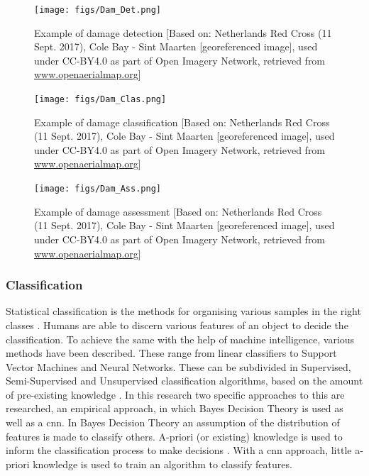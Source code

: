 \begin{figure}[!h]
	\centering
	\texttt{[image: figs/Dam\_Det.png]}
	\caption{\footnotesize{Example of damage detection [Based on: Netherlands Red Cross (11 Sept. 2017), Cole Bay - Sint Maarten [georeferenced image], used under CC-BY4.0 as part of Open Imagery Network, retrieved from \url{www.openaerialmap.org}]}}
	\label{fig:Dam_Det}
\end{figure}
\begin{figure}[!h]
	\centering
	\texttt{[image: figs/Dam\_Clas.png]}
	\caption{\footnotesize{Example of damage classification [Based on: Netherlands Red Cross (11 Sept. 2017), Cole Bay - Sint Maarten [georeferenced image], used under CC-BY4.0 as part of Open Imagery Network, retrieved from \url{www.openaerialmap.org}]}}
	\label{fig:Dam_Class}
\end{figure}
\begin{figure}[!h]
	\centering
	\texttt{[image: figs/Dam\_Ass.png]}
	\caption{\footnotesize{Example of damage assessment [Based on: Netherlands Red Cross (11 Sept. 2017), Cole Bay - Sint Maarten [georeferenced image], used under CC-BY4.0 as part of Open Imagery Network, retrieved from \url{www.openaerialmap.org}]}}
	\label{fig:Dam_Ass}
\end{figure}

\subsubsection*{Classification}
Statistical classification is the methods for organising various samples in the right classes \citep{Theodoridis2009}. Humans are able to discern various features of an object to decide the classification. To achieve the same with the help of machine intelligence, various methods have been described. These range from linear classifiers to Support Vector Machines and Neural Networks. These can be subdivided in Supervised, Semi-Supervised and Unsupervised classification algorithms, based on the amount of pre-existing knowledge \citep{Theodoridis2009}. In this research two specific approaches to this are researched, an empirical approach, in which Bayes Decision Theory is used as well as a \ac{cnn}. In Bayes Decision Theory an assumption of the distribution of features is made to classify others. A-priori (or existing) knowledge is used to inform the classification process to make decisions \citep{Theodoridis2009}. With a \ac{cnn} approach, little a-priori knowledge is used to train an algorithm to classify features. 

